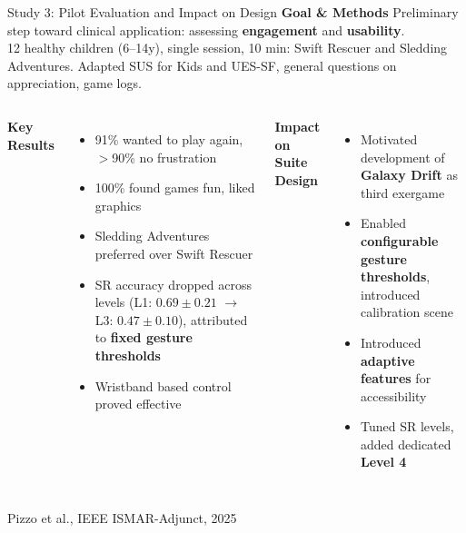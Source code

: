 \documentclass[aspectratio=169, 12pt]{beamer}
\newcommand{\citefooter}[1]{\hfill{\tiny #1}}
\begin{document}
\begin{frame}{Study 3: Pilot Evaluation and Impact on Design}
	\textbf{\textcolor{gbAqua}{Goal \& Methods}}
	\small
	Preliminary step toward clinical application: assessing \textbf{engagement} and \textbf{usability}.\\
	12 healthy children (6--14y), single session, 10 min: Swift Rescuer and Sledding Adventures. Adapted SUS for Kids and UES-SF, general questions on appreciation, game logs.

	\vspace{0.25cm}
	\begin{columns}[T]
		\textbf{\textcolor{gbAqua}{Key Results}}
		\small
		\begin{itemize}
			\setlength\itemsep{0em}
			\item 91\% wanted to play again, $>$90\% no frustration
			\item 100\% found games fun, liked graphics
			\item Sledding Adventures preferred over Swift Rescuer
			\item SR accuracy dropped across levels (L1: $0.69\pm0.21$ $\to$ L3: $0.47\pm0.10$), attributed to \textbf{fixed gesture thresholds}
			\item Wristband based control proved effective
		\end{itemize}

		\textbf{\textcolor{gbAqua}{Impact on Suite Design}}
		\small
		\begin{itemize}
			\setlength\itemsep{0em}
			\item Motivated development of \textbf{Galaxy Drift} as third exergame
			\item Enabled \textbf{configurable gesture thresholds}, introduced calibration scene
			\item Introduced \textbf{adaptive features} for accessibility
			\item Tuned SR levels, added dedicated \textbf{Level 4}
		\end{itemize}
	\end{columns}

	\citefooter{Pizzo et al., IEEE ISMAR-Adjunct, 2025}
\end{frame}
\end{document}
